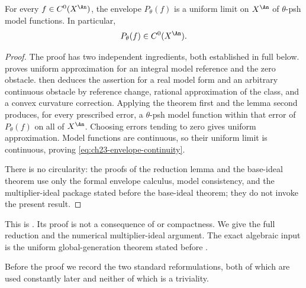 \begin{theorem}\label{thm:bfj-envelope-regularity}
For every \(f\in C^0(X^{\An})\), the envelope \(P_\theta(f)\) is a uniform
limit on \(X^{\An}\) of \(\theta\)-psh model functions.  In particular,
\begin{equation}\label{eq:ch23-envelope-continuity}
                         P_\theta(f)\in C^0(X^{\An}).
\end{equation}
\end{theorem}

\begin{proof}
The proof has two independent ingredients, both established in full below.
 proves uniform approximation for
an integral model reference and the zero obstacle.
 then deduces the assertion for a
real model form and an arbitrary continuous obstacle by reference change,
rational approximation of the class, and a convex curvature correction.
Applying the theorem first and the lemma second produces, for every
prescribed error, a \(\theta\)-psh model function within that error of
\(P_\theta(f)\) on all of \(X^{\An}\).  Choosing errors tending to zero gives
uniform approximation.  Model functions are continuous, so their uniform
limit is continuous, proving \eqref{eq:ch23-envelope-continuity}.

There is no circularity: the proofs of the reduction lemma and the
base-ideal theorem use only the formal envelope calculus, model consistency,
and the multiplier-ideal package stated before the base-ideal theorem; they
do not invoke the present result.
\end{proof}

This is \cite[Theorem~8.3]{BFJ16}.  Its proof is not a consequence of
 or compactness.  We give the full reduction
and the numerical multiplier-ideal argument.  The exact algebraic input is
the uniform global-generation theorem stated before
.

Before the proof we record the two standard reformulations, both of which are
used constantly later and neither of which is a triviality.

